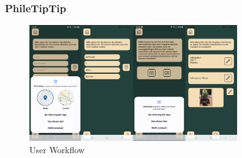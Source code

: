 \begin{frame}
\frametitle{PhileTipTip}

\begin{figure}
  \includegraphics[width=0.8\textwidth]{figures/userworkflow.jpg}
  \caption{User Workflow}
  \label{fig:workflow}
\end{figure}

\end{frame}




